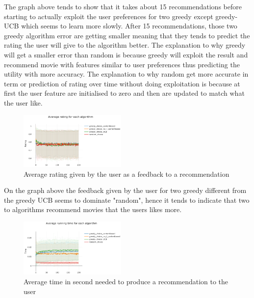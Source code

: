 \documentclass[letterpaper]{article}
\begin{document}
The graph above tends to show that it takes about 15 recommendations before starting to actually exploit the user preferences for two greedy except greedy-UCB which seems to learn more slowly. After 15 recommendations, those two greedy algorithm error are getting smaller meaning that they tends to predict the rating the user will give to the algorithm better.
The explanation to why greedy will get a smaller error than random is because greedy will exploit the result and recommend movie with features similar to user preferences thus predicting the utility with more accuracy.
The explanation to why random get more accurate in term or prediction of rating over time without doing exploitation is because at first the user feature are initialised to zero and then are updated to match what the user like.

\begin{figure}[H]
\begin{center}
\includegraphics[width=0.47\textwidth]{img/greedy2.png}
\caption{Average rating given by the user as a feedback to a recommendation}
\label{schema2}
\end{center}
\end{figure}

On the graph above the feedback given by the user for two greedy different from the greedy UCB seems to dominate "random", hence it tends to indicate that two to algorithms recommend movies that the users likes more.

\begin{figure}[H]
\begin{center}
\includegraphics[width=0.47\textwidth]{img/greedy3.png}
\caption{Average time in second needed to produce a recommendation to the user}
\label{greedy3}
\end{center}
\end{figure}
\end{document}
